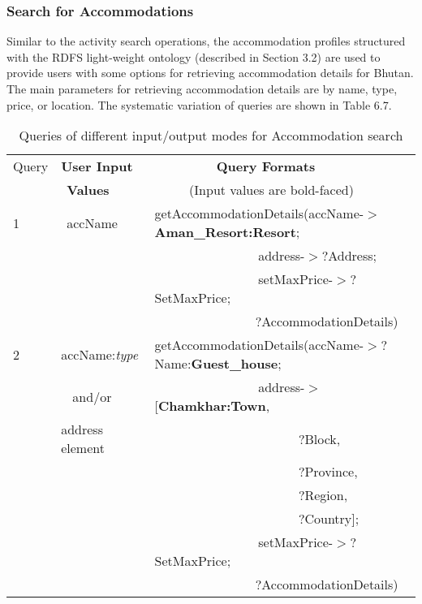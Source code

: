 \subsubsection{Search for Accommodations}
\hspace{0.3in}Similar to the activity search operations, the accommodation profiles structured with the RDFS light-weight ontology (described in Section 3.2) are used to provide users with some options for retrieving accommodation details for Bhutan. The main parameters for retrieving accommodation details are by name, type, price, or location. The systematic variation of queries are shown in Table 6.7.
\begin{table} [tbph]
\caption{Queries of different input/output modes for Accommodation search}
\centering
\footnotesize
\begin{tabular}{|l|l|l|}
\hline
 Query&\textbf{User Input} &$~~~~~~~~~~~~~~~~~~~~$ \textbf{Query Formats} \\
 &$~~$\textbf{Values}   &  $~~~~~~~~~~~~$(Input values are bold-faced)       \\
\hline
 1&$~~$accName & getAccommodationDetails(accName-$>$\textbf{Aman\_Resort:Resort};\\
  &        &$~~~~~~~~~~~~~~~~~~~~~~~~~~~~~~~~~~~~$address-$>?$Address; \\
  &        &$~~~~~~~~~~~~~~~~~~~~~~~~~~~~~~~~~~~~$setMaxPrice-$>?$SetMaxPrice; \\
  &        &$~~~~~~~~~~~~~~~~~~~~~~~~~~~~~~~~~~~?$AccommodationDetails)\\
\hline
 2&$~~$accName:\emph{type} & getAccommodationDetails(accName-$>?$Name:\textbf{Guest\_house};\\
  &$~~~~$and/or      &$~~~~~~~~~~~~~~~~~~~~~~~~~~~~~~~~~~~~$address-$>$[\textbf{Chamkhar:Town}, \\
  &address element     &$~~~~~~~~~~~~~~~~~~~~~~~~~~~~~~~~~~~~~~~~~~~~~~~~~~?$Block, \\
  &                       &$~~~~~~~~~~~~~~~~~~~~~~~~~~~~~~~~~~~~~~~~~~~~~~~~~~?$Province,  \\
  &                       &$~~~~~~~~~~~~~~~~~~~~~~~~~~~~~~~~~~~~~~~~~~~~~~~~~~?$Region, \\
  &                       &$~~~~~~~~~~~~~~~~~~~~~~~~~~~~~~~~~~~~~~~~~~~~~~~~~~?$Country]; \\ 
  &                       &$~~~~~~~~~~~~~~~~~~~~~~~~~~~~~~~~~~~~$setMaxPrice-$>?$SetMaxPrice;\\                
  &                      &$~~~~~~~~~~~~~~~~~~~~~~~~~~~~~~~~~~~?$AccommodationDetails)\\      

\end{tabular}
\end{table}
